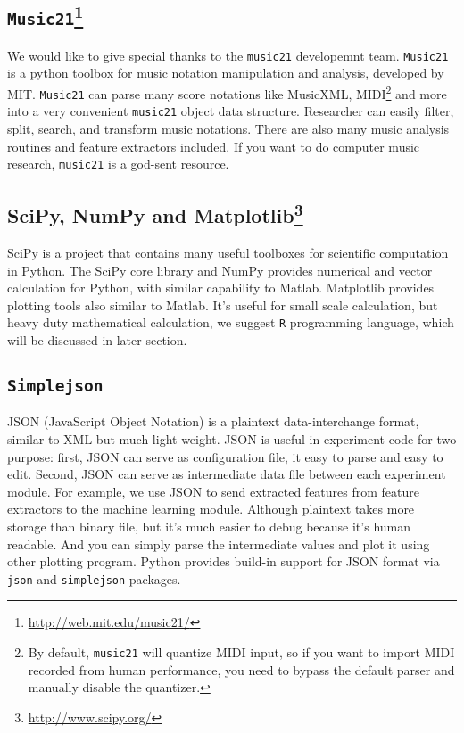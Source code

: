    \subsection*{\texttt{Music21}\footnote{\url{http://web.mit.edu/music21/}}}
   We would like to give special thanks to the \texttt{music21} developemnt team. \texttt{Music21} is a python toolbox for music notation manipulation and analysis, developed by MIT. \texttt{Music21} can parse many score notations like MusicXML, MIDI\footnote{By default, \texttt{music21} will quantize MIDI input, so if you want to import MIDI recorded from human performance, you need to bypass the default parser and manually disable the quantizer.} and more into a very convenient \texttt{music21} object data structure. Researcher can easily filter, split, search, and transform music notations. There are also many music analysis routines and feature extractors included. If you want to do computer music research, \texttt{music21} is a god-sent resource. 
   \subsection*{SciPy, NumPy and Matplotlib\footnote{\url{http://www.scipy.org/}}}
   SciPy is a project that contains many useful toolboxes for scientific computation in Python. The SciPy core library and NumPy provides numerical and vector calculation for Python, with similar capability to Matlab. Matplotlib provides plotting tools also similar to Matlab. It's useful for small scale calculation, but heavy duty mathematical calculation, we suggest \texttt{R} programming language, which will be discussed in later section.

   \subsection*{\texttt{Simplejson}}
   JSON (JavaScript Object Notation) is a plaintext data-interchange format, similar to XML but much light-weight. JSON is useful in experiment code for two purpose: first, JSON can serve as configuration file, it easy to parse and easy to edit. Second, JSON can serve as intermediate data file between each experiment module. For example, we use JSON to send extracted features from feature extractors to the machine learning module. Although plaintext takes more storage than binary file, but it's much easier to debug because it's human readable. And you can simply parse the intermediate values and plot it using other plotting program. Python provides build-in support for JSON format via \texttt{json} and \texttt{simplejson} packages.

